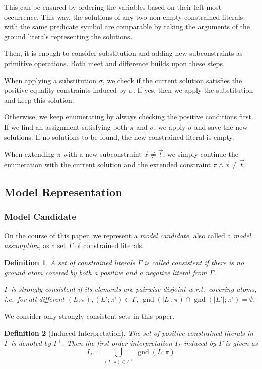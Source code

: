 \documentclass[a4paper]{article}
\newcommand{\mGnd}{\operatorname{gnd}} \newcommand{\mLVar}{\operatorname{lvar}} \newcommand{\mRVar}{\operatorname{rvar}} \newcommand{\mDmn}{\operatorname{dom}} \newcommand{\mRng}{\operatorname{rng}} \newcommand{\mMGU}{\operatorname{mgu}} \newcommand{\mDef}{\operatorname{def}} \newcommand{\mDomain}{\mathcal{D}} \newcommand{\mVar}{\operatorname{var}}
\newtheorem{defi}{Definition}[section]
\begin{document}
This can be ensured by ordering the variables based on their left-most occurrence. 
This way, the solutions of any two non-empty constrained literals with the same predicate symbol are comparable by taking 
the arguments of the ground literals representing the solutions.

Then, it is enough to consider substitution and adding new subconstraints as primitive operations. Both meet and difference builds upon these steps. 

When applying a substitution $\sigma$, we check if the current solution satisfies the positive equality constraints induced by $\sigma$. 
If yes, then we apply the substitution and keep this solution.

Otherwise, we keep enumerating by always checking the positive conditions first. If we find an assignment satisfying both $\pi$ and $\sigma$, we apply $\sigma$ and 
save the new solutions. If no solutions to be found, the new constrained literal is empty.

When extending $\pi$ with a new subconstraint $\vec{x} \ne \vec{t}$, 
we simply continue the enumeration with the current solution and the extended constraint $\pi \land \vec{x} \ne \vec{t}$.
 

\subsection{Model Representation}
\subsubsection*{Model Candidate}
On the course of this paper, we represent a \emph{model candidate}, also called a \emph{model assumption}, as a set $\Gamma$ of constrained literals. 

\begin{defi}
A set of constrained literals $\Gamma$ is called \emph{consistent} if there is no ground atom covered by both a positive and a negative literal from $\Gamma$.

$\Gamma$ is \emph{strongly consistent} if its elements are pairwise disjoint w.r.t.\
covering atoms, i.e.\ 
for all different $(L;\pi), (L'; \pi') \in \Gamma$,
$\mGnd(|L|; \pi) \cap \mGnd(|L'|; \pi') = \emptyset$.
\end{defi}

\noindent
We consider only strongly consistent sets in this paper.

\begin{defi}[Induced Interpretation]
The set of positive constrained literals in $\Gamma$ is denoted by $\Gamma^+$. 
Then the \emph{first-order interpretation $I_{\Gamma}$ induced by} $\Gamma$ is given as
\[I_{\Gamma} = \bigcup_{(L;\pi) \in \Gamma^+}~\mGnd(L;\pi)\]
\end{defi}
\end{document}
